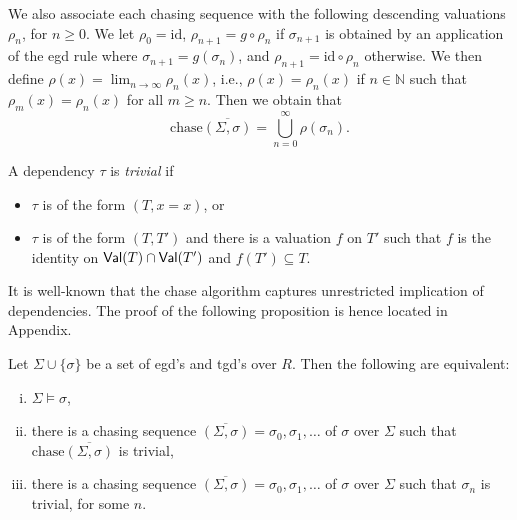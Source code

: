 \documentclass[envcountset]{llncs}
\newcommand{\problemFont}[1]{\protect\ensuremath{\mathsf{#1}}}
\newcommand{\si}{\sigma}
\newcommand{\Si}{\Sigma}
\newcommand{\sub}{\subseteq}
\newcommand{\N}{\mathbb{N}}
\newcommand{\Val}{\problemFont{Val}}
\newcommand{\chase}[1]{\overline{(#1)}}
\newcommand{\ochase}[1]{\textrm{chase}\overline{(#1)}}
\newcommand{\id}{\mathrm{id}}
\begin{document}
We also associate each chasing sequence with the following descending valuations $\rho_n$, for $n \geq 0$. We let  $\rho_0=\id$, $\rho_{n+1}= g\circ \rho_n$ if $\si_{n+1}$ is obtained by an application of the egd rule where $\si_{n+1}=g(\si_{n})$, and $\rho_{n+1}= \id\circ \rho_n$ otherwise. We then define $\rho(x) = \lim_{n\to \infty} \rho_n(x)$, i.e., $\rho(x) = \rho_n(x)$ if $n\in\N$ such that $\rho_{m}(x) =\rho_n(x)$ for all $m\geq n$. Then we obtain that 
$$\ochase{\Si,\si} =\bigcup_{n=0}^{\infty}\rho(\si_n).$$

A dependency $\tau$ is \emph{trivial} if
\begin{itemize}
\item $\tau$ is of the form $(T,x=x)$, or
\item $\tau$ is of the form $(T,T')$ and there is a valuation $f$ on $T'$ such that $f$ is the identity on $\Val(T)\cap\Val(T')$ and $f(T') \sub T$.
\end{itemize}


It is well-known that the chase algorithm captures unrestricted implication of dependencies. The proof of the following proposition is hence located in Appendix.
\begin{proposition}\label{chase}
Let $\Si\cup\{\si\}$ be a set of egd's and tgd's over  $R$. Then the following are equivalent:
\begin{enumerate}[(i)]
\item $\Si \models \si$,
\item there is a chasing sequence $\chase{\Si,\si}=\si_0, \si_1,\ldots $ of $\si$ over $\Si$ such that  $\ochase{\Si,\si}$ is trivial,
\item there is a chasing sequence $\chase{\Si,\si}=\si_0, \si_1,\ldots $ of $\si$ over $\Si$ such that  $\si_n$ is trivial, for some $n$.
\end{enumerate}
\end{proposition}
\end{document}
